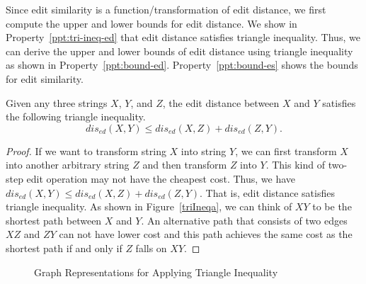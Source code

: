 Since edit similarity is a function/transformation of edit distance, we first compute the upper and lower bounds for edit distance. We show in Property~\ref{ppt:tri-ineq-ed} that edit distance satisfies triangle inequality. Thus, we can derive the upper and lower bounds of edit distance using triangle inequality as shown in Property~\ref{ppt:bound-ed}. Property~\ref{ppt:bound-es} shows the bounds for edit similarity. 

\begin{property}\label{ppt:tri-ineq-ed}
Given any three strings $X$, $Y$, and $Z$, the edit distance between $X$ and $Y$ satisfies the following triangle inequality. 
$$dis_{ed}(X,Y) \leq dis_{ed}(X,Z)+dis_{ed}(Z,Y).$$
\end{property}

\begin{proof}
If we want to transform string $X$ into string $Y$, we can first transform $X$ into another arbitrary string $Z$ and then transform $Z$ into $Y$. This kind of two-step edit operation may not have the cheapest cost. Thus, we have $dis_{ed}(X,Y) \leq dis_{ed}(X,Z)+dis_{ed}(Z,Y).$ That is, edit distance satisfies triangle inequality. As shown in Figure~\ref{triIneqa}, we can think of $XY$ to be the shortest path between $X$ and $Y$. An alternative path that consists of two edges $XZ$ and $ZY$ can not have lower cost and this path achieves the same cost as the shortest path if and only if $Z$ falls on $XY$.
\end{proof}


\begin{figure}[tb]
\centering
{}
\quad
{}

\caption{Graph Representations for Applying Triangle Inequality}
\label{triIneq}
\end{figure}


